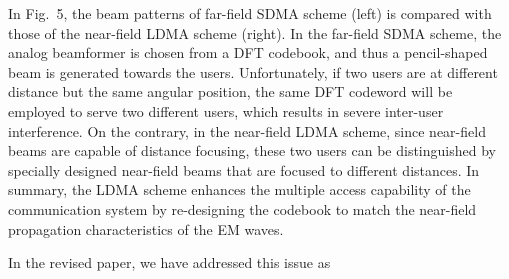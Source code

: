 \documentclass[a4paper,12pt]{article}
\begin{document}
{{\quad In Fig.~5, the beam patterns of far-field SDMA scheme (left) is compared with those of the near-field LDMA scheme (right). In the far-field SDMA scheme, the analog beamformer is chosen from a DFT codebook, and thus a pencil-shaped beam is generated towards the users. Unfortunately, if two users are at different distance but the same angular position, the same DFT codeword will be employed to serve two different users, which results in severe inter-user interference. 
On the contrary, in the near-field LDMA scheme, since near-field beams are capable of distance focusing, these two users can be distinguished by specially designed near-field beams that are focused to different distances. In summary, the LDMA scheme enhances the multiple access capability of the communication system by re-designing the codebook to match the near-field propagation characteristics of the EM waves. 





\quad In the revised paper, we have addressed this issue as 


}}
\end{document}
